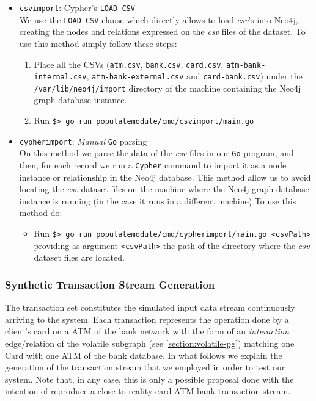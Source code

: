 \begin{itemize}
\item{\texttt{csvimport}: Cypher's \texttt{LOAD CSV}}\\
We use the \texttt{LOAD CSV} clause which directly allows to load \emph{csv}'s into Neo4j, creating the nodes and relations expressed on the \emph{csv} files of the dataset.
To use this method simply follow these steps:
\begin{enumerate}
    \item Place all the CSVs (\texttt{atm.csv}, \texttt{bank.csv}, \texttt{card.csv}, \texttt{atm-bank-internal.csv}, \texttt{atm-bank-external.csv} 
    and \texttt{card-bank.csv}) under the \texttt{/var/lib/neo4j/import} directory
    of the machine containing the Neo4j graph database instance.
    \item Run \texttt{\$> go run populatemodule/cmd/csvimport/main.go}
\end{enumerate}

\item {\texttt{cypherimport}: \emph{Manual} \texttt{Go} parsing\\}
On this method we parse the data of the \emph{csv} files in our \texttt{Go} program, and then, for each record we run a \texttt{Cypher} command to import it as a node instance or relationship in the Neo4j database. This method allow us to avoid locating the \emph{csv} dataset files on the machine where the Neo4j graph database instance is running (in the case it runs in a different machine)
To use this method do:

\begin{itemize}
    \item Run \texttt{\$> go run populatemodule/cmd/cypherimport/main.go <csvPath>}\\ providing as argument \texttt{<csvPath>} the path of the directory where the \emph{csv} dataset files are located.
\end{itemize}

\end{itemize}

\subsubsection{Synthetic Transaction Stream Generation}\label{datasets:transactionstream}


The transaction set constitutes the simulated input data stream continuously arriving to the system. Each transaction represents the operation done by a client's card on a ATM of the bank network with the form of an \emph{interaction} edge/relation of the volatile subgraph (see \ref{section:volatile-pg}) matching one Card with one ATM of the bank database. In what follows we explain the generation of the transaction stream that we employed in order to test our system. Note that, in any case, this is only a possible proposal done with the intention of reproduce a close-to-reality card-ATM bank transaction stream.\\

